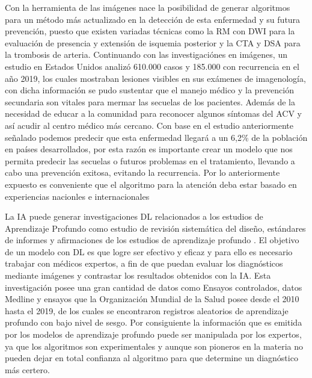 \par Con la herramienta de las imágenes nace la posibilidad de generar algoritmos para un método más actualizado en la detección de esta enfermedad y su futura prevención, puesto que existen variadas técnicas \cite{Wintermark2013} como la RM con DWI para la evaluación de presencia y extensión de isquemia posterior y la CTA y DSA para la trombosis de arteria. Continuando  con las investigaciónes en imágenes, un estudio en Estados Unidos \cite{Garcia2019}  analizó 610.000 casos y 185.000 con recurrencia en el año 2019,  los cuales mostraban lesiones visibles en sus exámenes de imagenología, con dicha información se pudo sustentar que el manejo médico y la prevención secundaria son vitales para mermar las secuelas de los pacientes. Además de la necesidad de educar a la comunidad para reconocer algunos síntomas del ACV y así acudir al centro médico más cercano. Con base en el estudio anteriormente señalado podemos predecir que esta enfermedad llegará a un 6,2\% de la población en  países desarrollados, por esta razón es importante crear un modelo que nos permita predecir las secuelas o futuros problemas en el tratamiento, llevando a cabo una prevención exitosa, evitando la recurrencia. Por lo anteriormente expuesto es conveniente que el algoritmo para la atención deba estar basado en experiencias nacionles e internacionales \cite{Garcia2019}\\

\par La IA puede generar investigaciones DL relacionados a los estudios de Aprendizaje Profundo como estudio de revisión sistemática del diseño, estándares de informes y afirmaciones de los estudios de aprendizaje profundo \cite{Pang2017}. El objetivo de un modelo con DL es que logre ser  efectivo y eficaz y para ello es necesario trabajar con médicos expertos, a fin de que puedan  evaluar los diagnósticos mediante imágenes y contrastar los resultados obtenidos con la IA. Esta investigación posee una gran cantidad de datos como Ensayos controlados, datos Medline y ensayos que la Organización Mundial de la Salud posee desde el 2010 hasta el 2019, de los cuales se encontraron registros aleatorios de aprendizaje profundo con bajo nivel de sesgo. Por consiguiente la información que es emitida por los modelos de aprendizaje profundo puede ser manipulada por los expertos, ya que los algoritmos \cite{Nagendran2020} son experimentales y aunque son pioneros en la materia no pueden dejar en total confianza al algoritmo para que determine un diagnóstico más certero.\\

